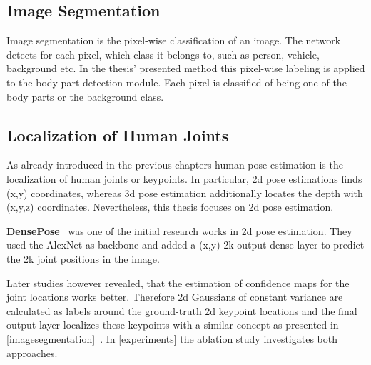 \subsection{Image Segmentation}
\label{imagesegmentation}
Image segmentation is the pixel-wise classification of an image.
The network detects for each pixel, which class it belongs to, such as person, vehicle, background etc.
In the thesis' presented method this pixel-wise labeling is applied to the body-part detection module.
Each pixel is classified of being one of the body parts or the background class.
%

\subsection{Localization of Human Joints}
As already introduced in the previous chapters human pose estimation is the localization of human joints or keypoints.
In particular, 2d pose estimations finds (x,y) coordinates, whereas 3d pose estimation additionally locates the depth
with
(x,y,z) coordinates.
Nevertheless, this thesis focuses on 2d pose estimation.

\textbf{DensePose}~\cite{DensePose} was one of the initial research works in 2d pose estimation.
They used the AlexNet as backbone and added a (x,y) 2k output dense layer to predict the 2k joint positions in the
image.

Later studies however revealed, that the estimation of confidence maps for the joint locations works better.
Therefore 2d Gaussians of constant variance are calculated as labels around the ground-truth 2d keypoint locations
and the final output layer localizes these keypoints
with a similar concept as presented in \autoref{imagesegmentation}~\cite{humanpose2dguide}.
In \autoref{experiments} the ablation study investigates both approaches.





